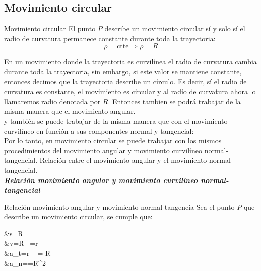 \subsection*{Movimiento circular}
\begin{Theorem*} {Movimiento circular}
	El punto $P$ describe un movimiento circular sí y solo sí el radio de curvatura permanece constante durante toda la trayectoria:
	$$ \rho=\text{ctte}\Rightarrow\rho=R $$
\end{Theorem*}
En un movimiento donde la trayectoria es curvilínea el radio de curvatura cambia durante toda la trayectoria, sin embargo, si este valor se mantiene constante, entonces decimos que la trayectoria describe un círculo. Es decir, sí el radio de curvatura es constante, el movimiento es circular y al radio de curvatura ahora lo llamaremos radio denotada por $R$. Entonces tambien se podrá trabajar de la misma manera que el movimiento angular. \\
y también se puede trabajar de la misma manera que con el movimiento curvilíneo en función a sus componentes normal y tangencial: \\
Por lo tanto, en movimiento circular se puede trabajar con los mismos procedimientos del movimiento angular y movimiento curvilíneo normal-tangencial.
Relación entre el movimiento angular y el movimiento normal-tangencial. \\
\textit{\textbf{Relación movimiento angular y movimiento curvilíneo normal-tangencial}}
\begin{Theorem*} {Relación movimiento angular y movimiento normal-tangencia}
	Sea el punto $P$ que describe un movimiento circular, se cumple que:
	\begin{flalign*}
		&s=R\theta \\
		&v=R \ =r\omega \\
		&a_t=r \  = R\alpha \\
		&a_n==R\omega^2
	\end{flalign*}
\end{Theorem*}